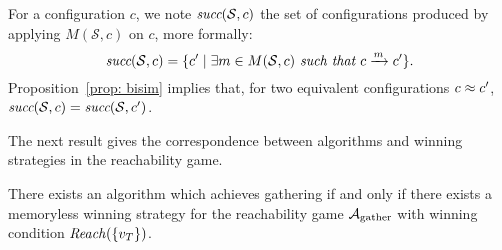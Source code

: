 For a configuration $c$, we note $\textit{succ}(\mathcal{S}, c)$ 
the set of configurations produced by applying $M(\mathcal{S}, c)$ on $c$, 
more formally:    $$\textit{succ}(\mathcal{S}, c) = \{ c' \mid \exists m \in M(\mathcal{S}, c) \textit{ such that } c\xrightarrow{m} c' \}.$$
Proposition~\ref{prop: bisim} implies that, for two equivalent configurations $c\approx c'$, 
$\textit{succ}(\mathcal{S}, c)  = \textit{succ}(\mathcal{S}, c')$.

The next result gives the correspondence between algorithms and winning strategies in the reachability game.
\begin{theorem}\label{th: correctness}
There exists an algorithm which achieves gathering if and only if there exists a memoryless winning strategy 
for the reachability game $\mathcal{A}_{\textrm{gather}}$ with winning condition $\mathit{Reach}(\{v_T\})$.
\end{theorem}

